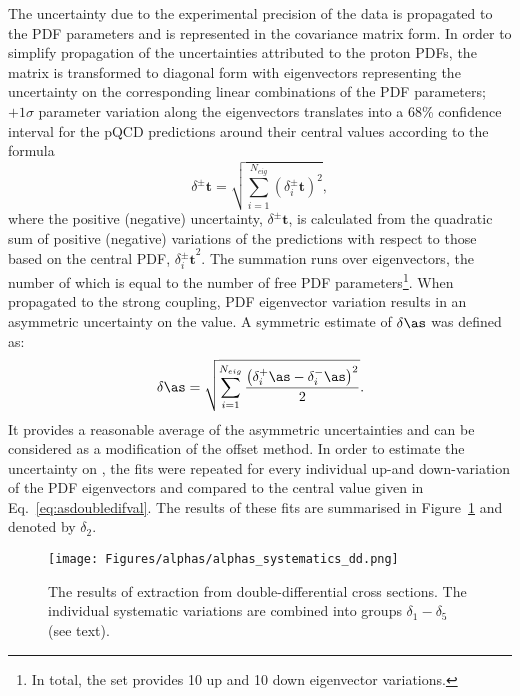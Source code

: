 The uncertainty due to the experimental precision of the data is propagated to the PDF parameters and is represented in the covariance matrix form. In order to simplify propagation of the uncertainties attributed to the proton PDFs, the matrix is transformed to diagonal form with eigenvectors representing the uncertainty on the corresponding linear combinations of the PDF parameters; $+1\sigma$ parameter variation along the eigenvectors translates into a 68\% confidence interval for the pQCD predictions around their central values according to the formula~\cite{Campbell:2006wx}
\begin{equation}
 \delta^{\pm}\mathbf{t} = \sqrt{\sum_{i=1}^{N_{eig}}{\left(\mbox{$\delta_i^{\pm}\mathbf{t}$}\right)^2}},
 \label{eq:mastereq}
\end{equation}
where the positive (negative) uncertainty, $\delta^{\pm}\mathbf{t}$, is calculated from the quadratic sum of positive (negative) variations of the predictions with respect to those based on the central PDF, $\mbox{$\delta_i^{\pm}\mathbf{t}$}^2$. The summation runs over eigenvectors, the number of which is equal to the number of free PDF parameters\footnote{In total, the  set provides 10 up and 10 down eigenvector variations.}. When propagated to the strong coupling, PDF eigenvector variation results in an asymmetric uncertainty on the \as value. A symmetric estimate of $\delta\as$ was defined as:
\begin{equation}
 \delta\as = \sqrt{\sum_{i=1}^{N_{eig}}{\frac{\left(\mbox{$\delta_i^{+}\as$} - \mbox{$\delta_i^{-}\as$}\right)^2}{2}}}.
 \label{eq:mastereqsym}
\end{equation}
It provides a reasonable average of the asymmetric uncertainties and can be considered as a modification of the offset method. In order to estimate the uncertainty on \asz, the \as fits were repeated for every individual up-and down-variation of the PDF eigenvectors and compared to the central value given in Eq.~\ref{eq:asdoubledifval}. The results of these fits are summarised in Figure~\ref{fig:asthunc_dd} and denoted by $\delta_2$.
\begin{landscape}
\begin{figure}[p]
 \centering
 \caption{The results of \asz extraction from double-differential cross sections. The individual systematic variations are combined into groups $\delta_1-\delta_5$ (see text).}
 \label{fig:asthunc_dd}
 \texttt{[image: Figures/alphas/alphas\_systematics\_dd.png]}
\end{figure}
\end{landscape}

